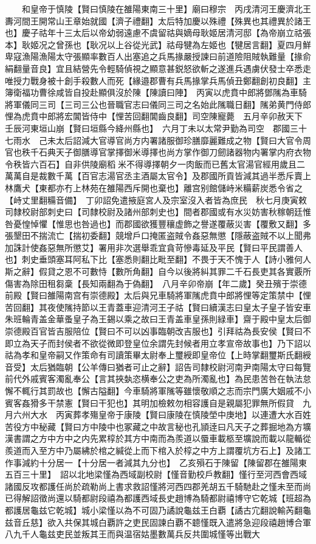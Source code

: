 　　和皇帝于慎陵【賢曰慎陵在雒陽東南三十里】廟曰穆宗　丙戌清河王慶濟北王夀河間王開常山王章始就國【濟子禮翻】太后特加慶以殊禮【殊異也其禮異於諸王也】慶子祜年十三太后以帝幼弱遠慮不虞留祜與嫡母耿姬居清河邸【為帝崩立祜張本】耿姬况之曾孫也【耿况以上谷從光武】祜母犍為左姬也【犍居言翻】夏四月鮮卑寇漁陽漁陽太守張顯率數百人出塞追之兵馬掾嚴授諫曰前道險阻賊執難量【掾俞絹翻量音良】宜且結營先令輕騎偵視之顯意甚鋭怒欲斬之遂進兵遇虜伏發士卒悉走唯授力戰身被十創手殺數人而死【緣邉郡曹有兵馬掾掌兵馬偵丑鄭翻創初良翻】主簿衛福功曹徐咸皆自投赴顯俱沒於陳【陳讀曰陣】　丙寅以虎賁中郎將鄧隲為車騎將軍儀同三司【三司三公也晉職官志曰儀同三司之名始此隲職日翻】隲弟黄門侍郎悝為虎賁中郎將宏閶皆侍中【悝苦回翻閶齒良翻】司空陳寵薨　五月辛卯赦天下　壬辰河東垣山崩【賢曰垣縣今絳州縣也】　六月丁未以太常尹勤為司空　郡國三十七雨水　己未太后詔減大官導官尚方内署諸服御珍膳靡麗難成之物【賢曰大官令周官也秩千石典天子御膳導官掌擇御米導擇也尚方掌作御刀劒諸器物内署掌内府衣物令秩皆六百石】自非供陵廟稻米不得導擇朝夕一肉飯而已舊太官湯官經用歲且二萬萬自是裁數千萬【百官志湯官丞主酒屬太官令】及郡國所貢皆減其過半悉斥賣上林鷹犬【東都亦冇上林苑在雒陽西斥開也棄也】離宫别館儲峙米糒薪炭悉令省之【峙丈里翻糒音備】　丁卯詔免遣掖庭宮人及宗室沒入者皆為庶民　秋七月庚寅敕司隸校尉部刺史曰【司隸校尉及諸州部刺史也】間者郡國或有水災妨害秋稼朝廷惟咎憂惶悼懼【惟思也咎過也】而郡國欲獲豐穰虚飾之譽遂覆蔽災害【覆敷又翻】多張墾田不揣流亡【揣初委翻】競增戶口掩匿盗賊令姦惡無懲【隱蔽盗賊不以上聞弗加誅計使姦惡無所懲艾】署用非次選舉乖宜貪苛慘毒延及平民【賢曰平民謂善人也】刺史垂頭塞耳阿私下比【塞悉則翻比毗至翻】不畏于天不愧于人【詩小雅何人斯之辭】假貸之恩不可數恃【數所角翻】自今以後將糾其罪二千石長吏其各實覈所傷害為除田租芻稾【長知兩翻為于偽翻】　八月辛卯帝崩【年二歲】癸丑殯于崇德前殿【賢曰雒陽南宫有崇德殿】太后與兄車騎將軍隲虎賁中郎將悝等定策禁中【悝苦回翻】其夜使隲持節以王青蓋車迎清河王子祜【賢曰續漢志曰皇太子皇子皆安車朱班輪青盖金華蚤皇子為王錫以乘之故曰王青盖車皇孫則緑車】齋于殿中皇太后御崇德殿百官皆吉服陪位【賢曰不可以凶事臨朝改吉服也】引拜祜為長安侯【賢曰不即立為天子而封侯者不欲從微即登皇位余謂先封候者用立孝宣帝故事也】乃下詔以祜為孝和皇帝嗣又作策命有司讀策畢太尉奉上璽綬即皇帝位【上時掌翻璽斯氏翻綬音受】太后猶臨朝【公羊傳曰猶者可止之辭】詔告司隸校尉河南尹南陽太守曰每覽前代外戚賓客濁亂奉公【言其挾埶恣横奉公之吏為所濁亂也】為民患苦咎在執法怠懈不輒行其罰故也【懈古隘翻】今車騎將軍隲等雖懷敬順之志而宗門廣大姻戚不小賓客姦猾多干禁憲【賢曰干犯也】其明加檢敕勿相容護自是親屬犯罪無所假貸　九月六州大水　丙寅葬孝殤皇帝于康陵【賢曰康陵在慎陵塋中庚地】以連遭大水百姓苦役方中秘藏【賢曰方中陵中也冢藏之中故言秘也孔頴逹曰凡天子之葬掘地為方壙漢書謂之方中方中之内先累椁於其方中南而為羨道以蜃車載柩至壙說而載以龍輴從羨道而入至方中乃屬紼於棺之緘從上而下棺入於椁之中方上謂覆坑方石上】及諸工作事減約十分居一【十分居一者減其九分也】　乙亥殞石于陳留【陳留郡在雒陽東五百三十里】　詔以北地梁慬為西域副校尉【慬音勤校戶教翻】慬行至河西會西域諸國反攻都護任尚於疏勒尚上書求救詔慬將河西四郡羌胡五千騎馳赴之慬未至而尚已得解詔徵尚還以騎都尉段禧為都護西域長史趙博為騎都尉禧博守它乾城【班超為都護居龜兹它乾城】城小梁慬以為不可固乃譎說龜兹王白覇【譎古宂翻說輸芮翻龜兹音丘慈】欲入共保其城白覇許之吏民固諫白覇不聼慬既入遣將急迎段禧趙博合軍八九千人龜兹吏民並叛其王而與温宿姑墨數萬兵反共圍城慬等出戰大